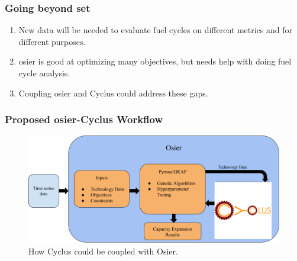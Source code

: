 \begin{frame}
    \frametitle{Going beyond \gls{set}}
    \begin{enumerate}
        \item New data will be needed to evaluate fuel cycles on different metrics and for different purposes.
        \item \gls{osier} is good at optimizing many objectives, but needs help with doing fuel cycle analysis.
        \item Coupling \gls{osier} and Cyclus could address these gaps.
    \end{enumerate}
\end{frame}
\begin{frame}
    \frametitle{Proposed \Gls{osier}-Cyclus Workflow}
    \begin{figure}[htbp!]
    \centering
    \includegraphics[width=\columnwidth]{figures/osier_flow_cyclus}
    \caption{How Cyclus could be coupled with Osier.}
    \label{fig:osier_flow_cyclus}
\end{figure}
\end{frame}
